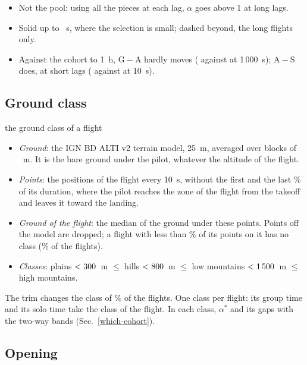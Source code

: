 \documentclass[10pt,a4paper]{article}
\newcommand{\G}{\mathrm{G}}
\newcommand{\A}{\mathrm{A}}
\newcommand{\Sl}{\mathrm{S}}
\newenvironment{step}{\begin{description}[leftmargin=0pt, itemsep=7pt, topsep=8pt]}{\end{description}}
\begin{document}
\begin{step}
\begin{itemize}
    piece that reaches it, no composition term.
  \item Not the pool: using all the pieces at each lag, $\alpha$ goes above 1 at long lags.
  \item Solid up to \ChainSolidEnd~s, where the selection is small; dashed beyond, the long flights only.
  \item Against the cohort to 1~h, $\G-\A$ hardly moves (\ChainGAThousand{} against \GapAllGAThousand{} at
    1\,000~s); $\A-\Sl$ does, at short lags (\ChainASTen{} against \GapAllASTen{} at 10~s).
  \end{itemize}
\end{step}

\subsection{Ground class}\label{ground-class}

\begin{method}{the ground class of a flight}
  \begin{itemize}
  \item \emph{Ground}: the IGN BD ALTI v2 terrain model, 25~m, averaged over blocks of \GroundCell~m. It is the
    bare ground under the pilot, whatever the altitude of the flight.
  \item \emph{Points}: the positions of the flight every 10~s, without the first and the last \GroundTrim\% of
    its duration, where the pilot reaches the zone of the flight from the takeoff and leaves it toward the
    landing.
  \item \emph{Ground of the flight}: the median of the ground under these points. Points off the model are
    dropped; a flight with less than \GroundMinOnDem\% of its points on it has no class (\GroundUnknown\% of
    the flights).
  \item \emph{Classes}: plains $<300$~m $\le$ hills $<800$~m $\le$ low mountains
    $<1\,500$~m $\le$ high mountains.
  \end{itemize}
  The trim changes the class of \GroundChanged\% of the flights. One class per flight: its group time and its
  solo time take the class of the flight. In each class, $\alpha^*$ and its gaps with the two-way bands
  (Sec.~\ref{which-cohort}).
\end{method}

\subsection{Opening}\label{open-flights}\label{opening}
\end{document}
